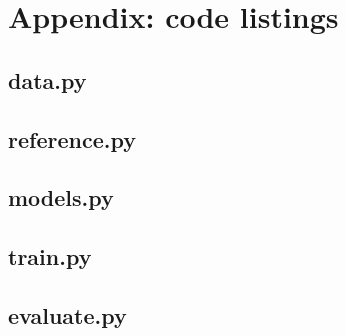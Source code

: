 \section*{Appendix: code listings}
\lstset{basicstyle=\ttfamily\scriptsize, breaklines=true, numbers=left, numberstyle=\tiny, frame=single}
\subsection*{data.py}

\subsection*{reference.py}

\subsection*{models.py}

\subsection*{train.py}

\subsection*{evaluate.py}

